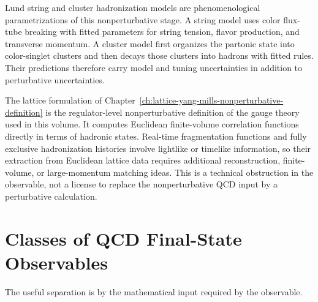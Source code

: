 Lund string and cluster hadronization models are phenomenological
parametrizations of this nonperturbative stage.  A string model uses color
flux-tube breaking with fitted parameters for string tension, flavor
production, and transverse momentum.  A cluster model first organizes the
partonic state into color-singlet clusters and then decays those clusters into
hadrons with fitted rules.  Their predictions therefore carry model and tuning
uncertainties in addition to perturbative uncertainties.

The lattice formulation of
Chapter~\ref{ch:lattice-yang-mills-nonperturbative-definition} is the
regulator-level nonperturbative definition of the gauge theory used in this
volume.  It computes Euclidean finite-volume correlation functions directly in
terms of hadronic states.  Real-time fragmentation functions and fully
exclusive hadronization histories involve lightlike or timelike information,
so their extraction from Euclidean lattice data requires additional
reconstruction, finite-volume, or large-momentum matching ideas.  This is a
technical obstruction in the observable, not a license to replace the
nonperturbative QCD input by a perturbative calculation.

\section{Classes of QCD Final-State Observables}

The useful separation is by the mathematical input required by the observable.

